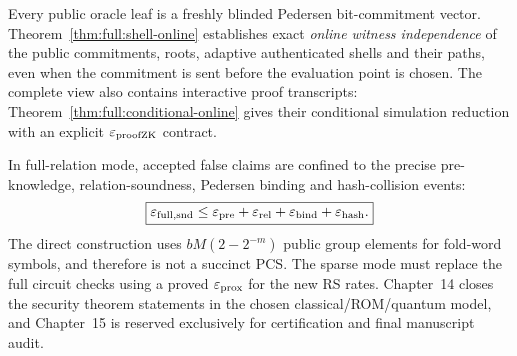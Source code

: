 Every public oracle leaf is a
freshly blinded Pedersen
bit-commitment vector.
Theorem~\ref{thm:full:shell-online}
establishes exact \emph{online
witness independence} of the
public commitments, roots,
adaptive authenticated shells
and their paths, even when the
commitment is sent before
the evaluation point is chosen.
The complete view also contains
interactive proof transcripts:
Theorem~\ref{thm:full:conditional-online}
gives their conditional simulation
reduction with an explicit
$\varepsilon_{\rm proofZK}$ contract.

In full-relation mode, accepted
false claims are confined to
the precise pre-knowledge,
relation-soundness, Pedersen
binding and hash-collision events:
\[
 \boxed{
 \varepsilon_{\rm full,snd}
 \le
 \varepsilon_{\rm pre}
 +\varepsilon_{\rm rel}
 +\varepsilon_{\rm bind}
 +\varepsilon_{\rm hash}.}
\]
The direct construction uses
$bM(2-2^{-m})$ public group
elements for fold-word symbols,
and therefore is not a succinct
PCS. The sparse mode must
replace the full circuit
checks using a proved
$\varepsilon_{\rm prox}$ for
the new RS rates. Chapter~14
closes the security theorem
statements in the chosen
classical/ROM/quantum model,
and Chapter~15 is reserved
exclusively for certification
and final manuscript audit.
